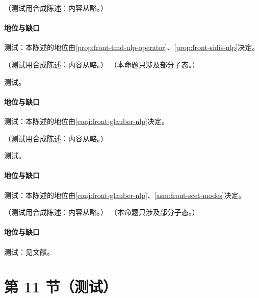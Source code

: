 \begin{conjecture}\label{conj:front-glauber-nlp}
（测试用合成陈述：内容从略。）
\end{conjecture}
\paragraph{地位与缺口}测试：本陈述的地位由\cref{prop:front-tmd-nlp-operator}、\cref{prop:front-sidis-nlp}决定。

\begin{proposition}\label{prop:front-tmd-nlp-operator}
（测试用合成陈述：内容从略。）
（本命题只涉及部分子态。）
\end{proposition}
\begin{proofsketch}测试。\end{proofsketch}
\paragraph{地位与缺口}测试：本陈述的地位由\cref{conj:front-glauber-nlp}决定。

\begin{proposition}\label{prop:front-sidis-nlp}
（测试用合成陈述：内容从略。）
\end{proposition}
\begin{proofsketch}测试。\end{proofsketch}
\paragraph{地位与缺口}测试：本陈述的地位由\cref{conj:front-glauber-nlp}、\cref{asm:front-scet-modes}决定。

\begin{proposition}\label{prop:front-nlp-tmd-oneloop}
（测试用合成陈述：内容从略。）
（本命题只涉及部分子态。）
\end{proposition}
\paragraph{地位与缺口}测试：见文献。

\section{第 11 节（测试）}\label{sec:front-smallx}

